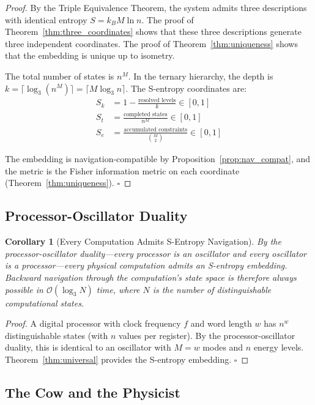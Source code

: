 \documentclass[12pt,twocolumn]{article}
\newtheorem{corollary}[theorem]{Corollary}
\begin{document}
\begin{proof}
By the Triple Equivalence Theorem, the system admits three descriptions with identical entropy $S = k_B M \ln n$. The proof of Theorem~\ref{thm:three_coordinates} shows that these three descriptions generate three independent coordinates. The proof of Theorem~\ref{thm:uniqueness} shows that the embedding is unique up to isometry.

The total number of states is $n^M$. In the ternary hierarchy, the depth is $k = \lceil \log_3(n^M) \rceil = \lceil M \log_3 n \rceil$. The S-entropy coordinates are:
\begin{align}
S_k &= 1 - \frac{\text{resolved levels}}{k} \in [0,1] \\
S_t &= \frac{\text{completed states}}{n^M} \in [0,1] \\
S_e &= \frac{\text{accumulated constraints}}{\binom{M}{2}} \in [0,1]
\end{align}

The embedding is navigation-compatible by Proposition~\ref{prop:nav_compat}, and the metric is the Fisher information metric on each coordinate (Theorem~\ref{thm:uniqueness}). $\square$
\end{proof}

\subsection{Processor-Oscillator Duality}

\begin{corollary}[Every Computation Admits S-Entropy Navigation]
\label{cor:computation}
By the processor-oscillator duality---every processor is an oscillator and every oscillator is a processor---every physical computation admits an S-entropy embedding. Backward navigation through the computation's state space is therefore always possible in $\mathcal{O}(\log_3 N)$ time, where $N$ is the number of distinguishable computational states.
\end{corollary}

\begin{proof}
A digital processor with clock frequency $f$ and word length $w$ has $n^w$ distinguishable states (with $n$ values per register). By the processor-oscillator duality, this is identical to an oscillator with $M = w$ modes and $n$ energy levels. Theorem~\ref{thm:universal} provides the S-entropy embedding. $\square$
\end{proof}

\subsection{The Cow and the Physicist}
\end{document}

